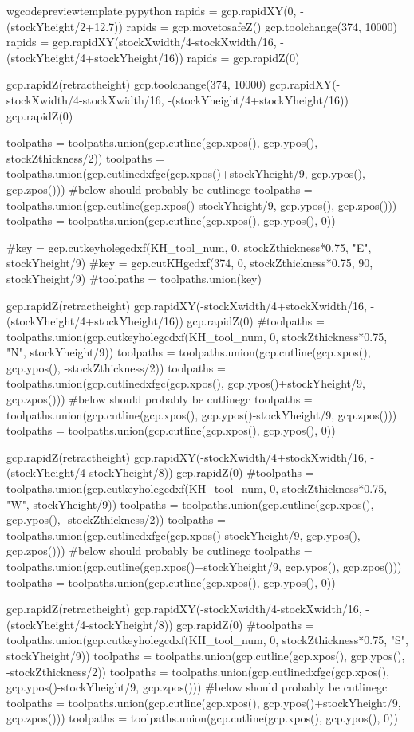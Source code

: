 \documentclass{ltxdoc}
\begin{document}
\begin{writecode}{w}{gcodepreviewtemplate.py}{python}
rapids = gcp.rapidXY(0, -(stockYheight/2+12.7))
rapids = gcp.movetosafeZ()
gcp.toolchange(374, 10000)
rapids = gcp.rapidXY(stockXwidth/4-stockXwidth/16, -(stockYheight/4+stockYheight/16))
rapids = gcp.rapidZ(0)

gcp.rapidZ(retractheight)
gcp.toolchange(374, 10000)
gcp.rapidXY(-stockXwidth/4-stockXwidth/16, -(stockYheight/4+stockYheight/16))
gcp.rapidZ(0)

toolpaths = toolpaths.union(gcp.cutline(gcp.xpos(), gcp.ypos(), -stockZthickness/2))
toolpaths = toolpaths.union(gcp.cutlinedxfgc(gcp.xpos()+stockYheight/9, gcp.ypos(), gcp.zpos()))
#below should probably be cutlinegc
toolpaths = toolpaths.union(gcp.cutline(gcp.xpos()-stockYheight/9, gcp.ypos(), gcp.zpos()))
toolpaths = toolpaths.union(gcp.cutline(gcp.xpos(), gcp.ypos(), 0))

#key = gcp.cutkeyholegcdxf(KH_tool_num, 0, stockZthickness*0.75, "E", stockYheight/9)
#key = gcp.cutKHgcdxf(374, 0, stockZthickness*0.75, 90, stockYheight/9)
#toolpaths = toolpaths.union(key)

gcp.rapidZ(retractheight)
gcp.rapidXY(-stockXwidth/4+stockXwidth/16, -(stockYheight/4+stockYheight/16))
gcp.rapidZ(0)
#toolpaths = toolpaths.union(gcp.cutkeyholegcdxf(KH_tool_num, 0, stockZthickness*0.75, "N", stockYheight/9))
toolpaths = toolpaths.union(gcp.cutline(gcp.xpos(), gcp.ypos(), -stockZthickness/2))
toolpaths = toolpaths.union(gcp.cutlinedxfgc(gcp.xpos(), gcp.ypos()+stockYheight/9, gcp.zpos()))
#below should probably be cutlinegc
toolpaths = toolpaths.union(gcp.cutline(gcp.xpos(), gcp.ypos()-stockYheight/9, gcp.zpos()))
toolpaths = toolpaths.union(gcp.cutline(gcp.xpos(), gcp.ypos(), 0))

gcp.rapidZ(retractheight)
gcp.rapidXY(-stockXwidth/4+stockXwidth/16, -(stockYheight/4-stockYheight/8))
gcp.rapidZ(0)
#toolpaths = toolpaths.union(gcp.cutkeyholegcdxf(KH_tool_num, 0, stockZthickness*0.75, "W", stockYheight/9))
toolpaths = toolpaths.union(gcp.cutline(gcp.xpos(), gcp.ypos(), -stockZthickness/2))
toolpaths = toolpaths.union(gcp.cutlinedxfgc(gcp.xpos()-stockYheight/9, gcp.ypos(), gcp.zpos()))
#below should probably be cutlinegc
toolpaths = toolpaths.union(gcp.cutline(gcp.xpos()+stockYheight/9, gcp.ypos(), gcp.zpos()))
toolpaths = toolpaths.union(gcp.cutline(gcp.xpos(), gcp.ypos(), 0))

gcp.rapidZ(retractheight)
gcp.rapidXY(-stockXwidth/4-stockXwidth/16, -(stockYheight/4-stockYheight/8))
gcp.rapidZ(0)
#toolpaths = toolpaths.union(gcp.cutkeyholegcdxf(KH_tool_num, 0, stockZthickness*0.75, "S", stockYheight/9))
toolpaths = toolpaths.union(gcp.cutline(gcp.xpos(), gcp.ypos(), -stockZthickness/2))
toolpaths = toolpaths.union(gcp.cutlinedxfgc(gcp.xpos(), gcp.ypos()-stockYheight/9, gcp.zpos()))
#below should probably be cutlinegc
toolpaths = toolpaths.union(gcp.cutline(gcp.xpos(), gcp.ypos()+stockYheight/9, gcp.zpos()))
toolpaths = toolpaths.union(gcp.cutline(gcp.xpos(), gcp.ypos(), 0))


\end{writecode}
\end{document}
